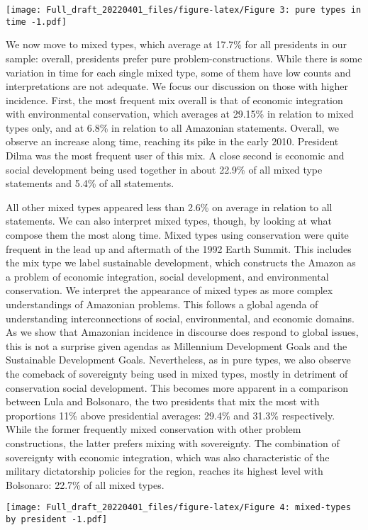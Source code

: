 \documentclass[
]{article}
\begin{document}
\texttt{[image: Full\_draft\_20220401\_files/figure-latex/Figure 3: pure types in time -1.pdf]}

We now move to mixed types, which average at 17.7\% for all presidents
in our sample: overall, presidents prefer pure problem-constructions.
While there is some variation in time for each single mixed type, some
of them have low counts and interpretations are not adequate. We focus
our discussion on those with higher incidence. First, the most frequent
mix overall is that of economic integration with environmental
conservation, which averages at 29.15\% in relation to mixed types only,
and at 6.8\% in relation to all Amazonian statements. Overall, we
observe an increase along time, reaching its pike in the early 2010.
President Dilma was the most frequent user of this mix. A close second
is economic and social development being used together in about 22.9\%
of all mixed type statements and 5.4\% of all statements.

All other mixed types appeared less than 2.6\% on average in relation to
all statements. We can also interpret mixed types, though, by looking at
what compose them the most along time. Mixed types using conservation
were quite frequent in the lead up and aftermath of the 1992 Earth
Summit. This includes the mix type we label sustainable development,
which constructs the Amazon as a problem of economic integration, social
development, and environmental conservation. We interpret the appearance
of mixed types as more complex understandings of Amazonian problems.
This follows a global agenda of understanding interconnections of
social, environmental, and economic domains. As we show that Amazonian
incidence in discourse does respond to global issues, this is not a
surprise given agendas as Millennium Development Goals and the
Sustainable Development Goals. Nevertheless, as in pure types, we also
observe the comeback of sovereignty being used in mixed types, mostly in
detriment of conservation social development. This becomes more apparent
in a comparison between Lula and Bolsonaro, the two presidents that mix
the most with proportions 11\% above presidential averages: 29.4\% and
31.3\% respectively. While the former frequently mixed conservation with
other problem constructions, the latter prefers mixing with sovereignty.
The combination of sovereignty with economic integration, which was also
characteristic of the military dictatorship policies for the region,
reaches its highest level with Bolsonaro: 22.7\% of all mixed types.

\texttt{[image: Full\_draft\_20220401\_files/figure-latex/Figure 4: mixed-types by president -1.pdf]}
\end{document}
